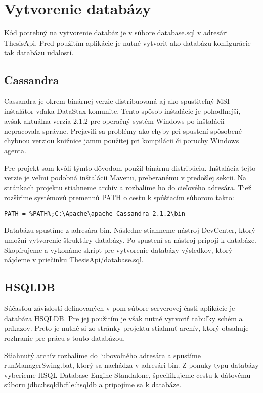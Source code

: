 \section{Vytvorenie databázy}
	Kód potrebný na vytvorenie databáz je v súbore database.sql v adresári ThesisApi. Pred použitím aplikácie je nutné vytvoriť ako databázu konfigurácie tak databázu udalostí.
	
	\subsection{Cassandra}	%
	Cassandra je okrem binárnej verzie distribuovaná aj ako spustiteľný MSI inštalátor vďaka DataStax komunite. Tento spôsob inštalácie je pohodlnejší, avšak aktuálna verzia 2.1.2 pre operačný systém Windows po inštalácii nepracovala správne. Prejavili sa problémy ako chyby pri spustení spôsobené chybnou verziou knižnice jamm použitej pri kompilácii či poruchy Windows agenta.
	
	Pre projekt som kvôli týmto dôvodom použil binárnu distribúciu. Inštalácia tejto verzie je veľmi podobná inštalácii Mavenu, preberanému v predošlej sekcii. Na stránkach projektu stiahneme archív a rozbalíme ho do cieľového adresára. Tiež rozšírime systémovú premennú PATH o cestu k spúšťacím súborom takto:
	\begin{lstlisting}[label=lst:pathcas,caption=Rozšírenie premennej prostredia PATH o Cassandru]
	PATH = %PATH%;C:\Apache\apache-Cassandra-2.1.2\bin
	\end{lstlisting}
	
	Databázu spustíme z adresára bin. Následne stiahneme nástroj DevCenter, ktorý umožní vytvorenie štruktúry databázy. Po spustení sa nástroj pripojí k databáze.
	Skopírujeme a vykonáme skript pre vytvorenie databázy výsledkov, ktorý nájdeme v priečinku ThesisApi/database.sql.
	
	\subsection{HSQLDB}
	Súčasťou závislostí definovaných v pom súbore serverovej časti aplikácie je databáza HSQLDB. Pre jej použitím je však nutné vytvoriť tabuľky schém a príkazov. Preto je nutné si zo stránky projektu stiahnuť archív, ktorý obsahuje rozhranie pre prácu s touto databázou.
	
	Stiahnutý archív rozbalíme do ľubovoľného adresára a spustíme runManagerSwing.bat, ktorý sa nachádza v adresári bin. Z ponuky typu databázy vyberieme HSQL Database Engine Standalone, špecifikujeme cestu k dátovému súboru jdbc:hsqldb:file:hsqldb a pripojíme sa k databáze.
	
